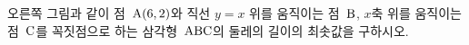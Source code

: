 \noindent\begin{minipage}[t]{0.58\linewidth}\vspace{0pt}\raggedright 오른쪽 그림과 같이 점~$\mathrm{A}(6{,}\mkern3mu\mathopen{}2)$와 직선 $y=x$ 위를 움직이는 점~$\mathrm{B}$, $x$축 위를 움직이는 점~$\mathrm{C}$를 꼭짓점으로 하는 삼각형~$\mathrm{ABC}$의 둘레의 길이의 최솟값을 구하시오.\end{minipage}\hfill\begin{minipage}[t]{0.4\linewidth}\vspace{0pt}\centering \resizebox{\ifdim\width>\linewidth\linewidth\else\width\fi}{!}{}\end{minipage}\par
